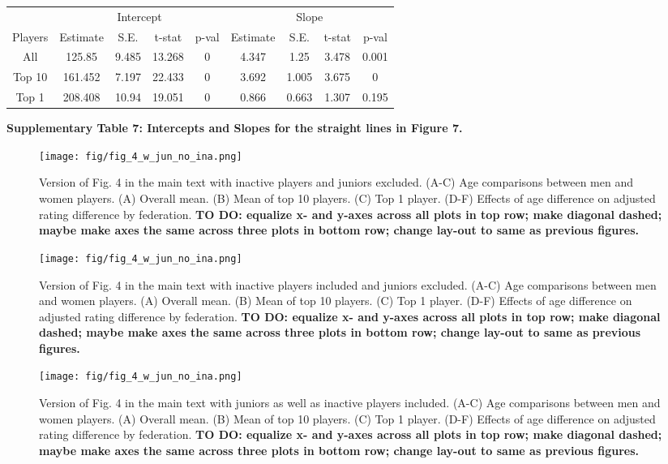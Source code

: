 \vskip0.2in
\begin{tabular}{|c|c|c|c|c|c|c|c|c|}
\hline
&\multicolumn{4}{|c|}{Intercept}&\multicolumn{4}{|c|}{Slope}\\
Players & Estimate & S.E. & t-stat & p-val & Estimate & S.E. & t-stat & p-val \\
\hline
All & 125.85&9.485&13.268&0&4.347&1.25&3.478&0.001\\
Top 10 & 161.452&7.197&22.433&0&3.692&1.005&3.675&0\\
Top 1 & 208.408&10.94&19.051&0&0.866&0.663&1.307&0.195\\
\hline
\end{tabular}
\newline\vskip0.1in\noindent
\textbf{Supplementary Table 7: Intercepts and Slopes for the straight lines in Figure 7.}


\begin{figure*}
    \centering
\texttt{[image: fig/fig\_4\_w\_jun\_no\_ina.png]}
    \caption{Version of Fig. 4 in the main text with inactive players and juniors excluded. (A-C) Age comparisons between men and women players. (A) Overall mean. (B) Mean of top 10 players. (C) Top 1 player. (D-F) Effects of age difference on adjusted rating difference by federation. {\bf TO DO: equalize x- and y-axes across all plots in top row; make diagonal dashed; maybe make axes the same across three plots in bottom row; change lay-out to same as previous figures.}}
\end{figure*}
\vskip 0.2in

\begin{figure*}
    \centering
\texttt{[image: fig/fig\_4\_w\_jun\_no\_ina.png]}
    \caption{Version of Fig. 4 in the main text with inactive players included and juniors excluded. (A-C) Age comparisons between men and women players. (A) Overall mean. (B) Mean of top 10 players. (C) Top 1 player. (D-F) Effects of age difference on adjusted rating difference by federation. {\bf TO DO: equalize x- and y-axes across all plots in top row; make diagonal dashed; maybe make axes the same across three plots in bottom row; change lay-out to same as previous figures.}}
\end{figure*}
\vskip 0.2in

\begin{figure*}
    \centering
\texttt{[image: fig/fig\_4\_w\_jun\_no\_ina.png]}
    \caption{Version of Fig. 4 in the main text with juniors as well as inactive players included. (A-C) Age comparisons between men and women players. (A) Overall mean. (B) Mean of top 10 players. (C) Top 1 player. (D-F) Effects of age difference on adjusted rating difference by federation. {\bf TO DO: equalize x- and y-axes across all plots in top row; make diagonal dashed; maybe make axes the same across three plots in bottom row; change lay-out to same as previous figures.}}
\end{figure*}
\vskip 0.2in



